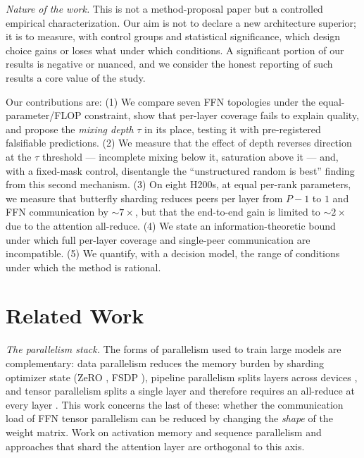 \documentclass[10pt,journal]{IEEEtran}
\begin{document}
\emph{Nature of the work.} This is not a method-proposal paper but a controlled empirical
characterization. Our aim is not to declare a new architecture superior; it is to measure,
with control groups and statistical significance, which design choice gains or loses what under
which conditions. A significant portion of our results is negative or nuanced, and we consider
the honest reporting of such results a core value of the study.

Our contributions are: (1) We compare seven FFN topologies under the equal-parameter/FLOP
constraint, show that per-layer coverage fails to explain quality, and propose the
\emph{mixing depth} $\tau$ in its place, testing it with pre-registered falsifiable
predictions. (2) We measure that the effect of depth reverses direction at the $\tau$
threshold --- incomplete mixing below it, saturation above it --- and, with a fixed-mask
control, disentangle the ``unstructured random is best'' finding from this second mechanism.
(3) On eight H200s, at equal per-rank parameters, we measure that butterfly
sharding reduces peers per layer from $P{-}1$ to $1$ and FFN communication by $\sim\!7\times$,
but that the end-to-end gain is limited to $\sim\!2\times$ due to the attention all-reduce.
(4) We state an information-theoretic bound under which full per-layer coverage and single-peer
communication are incompatible. (5) We quantify, with a decision model, the range of conditions
under which the method is rational.

\section{Related Work}
\emph{The parallelism stack.} The forms of parallelism used to train large models are
complementary: data parallelism reduces the memory burden by sharding optimizer state
(ZeRO \cite{zero2020}, FSDP \cite{fsdp2023}), pipeline parallelism splits layers across
devices \cite{gpipe2019}, and tensor parallelism splits a single layer and therefore requires
an all-reduce at every layer \cite{megatron2019,narayanan2021}. This work concerns the last of
these: whether the communication load of FFN tensor parallelism can be reduced by changing the
\emph{shape} of the weight matrix. Work on activation memory and sequence parallelism
\cite{korthikanti2023} and approaches that shard the attention layer \cite{ringattn2023} are
orthogonal to this axis.
\end{document}
